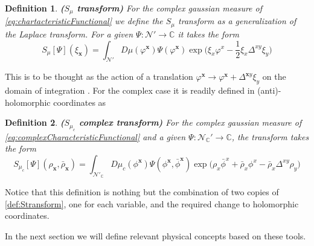 \documentclass[12pt]{article}%
\newtheorem{definition}{Definition}%
\begin{document}
\begin{definition}
    \label{def:Stransform}{\bf ($S_\mu$ transform)} For the complex gaussian measure of \eqref{eq:chartacteristicFunctional} we define the $S_\mu$ transform as a generalization of the Laplace transform. For a given $\Psi:\mathcal{N}'\to \mathbb{C}$ it takes the form 
    \begin{equation}
        \label{eq:stransform}
        S_\mu[\Psi](\xi_\mathbf{x})=\int_{\mathcal{N}'}D\mu(\varphi^{\mathbf{x}})\Psi(\varphi^{\mathbf{x}})\exp{\big(\xi_x\varphi^x-\frac12\xi_x\Delta^{xy}\xi_y\big)}
\end{equation}
\end{definition}
This is to be thought as the action of a translation $\varphi^{\mathbf{x}}\to\varphi^{\mathbf{x}}+\Delta^{\mathbf{x}y}\xi_y$ on the domain of integration . For the complex case it is readily defined in (anti)-holomorphic coordinates as 

\begin{definition}
    \label{def:SComplextransform}{\bf ($S_{\mu_c}$ complex transform)} For the complex gaussian measure of \eqref{eq:complexCharacteristicFunctional} and a given $\Psi:\mathcal{N}_{\mathbb{C}}'\to \mathbb{C}$, the transform takes the form 
    \begin{equation}
        \label{eq:stransformcomplex}
        S_{\mu_c}[\Psi](\rho_\mathbf{x},\bar\rho_\mathbf{x})=\int_{\mathcal{N}'_{\mathbb{C}}}D\mu_c(\phi^{\mathbf{x}})\Psi(\phi^{\mathbf{x}},\bar\phi^{\mathbf{x}})\exp{\big({\rho}_x\bar\phi^x+\bar{\rho}_x{\phi}^x-\bar\rho_x\Delta^{xy}\rho_y\big)}
        \end{equation}
\end{definition}

Notice that this definition is nothing but the combination of two copies of \autoref{def:Stransform}, one for each variable, and the required change to holomorphic coordinates.

In the next section we will define relevant physical concepts based on these tools.
\end{document}
